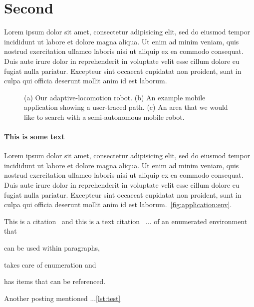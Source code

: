 \documentclass{proposal}
\begin{document}
\section{Second}
Lorem ipsum dolor sit amet, consectetur adipisicing elit, sed do eiusmod
tempor incididunt ut labore et dolore magna aliqua. Ut enim ad minim veniam,
quis nostrud exercitation ullamco laboris nisi ut aliquip ex ea commodo
consequat. Duis aute irure dolor in reprehenderit in voluptate velit esse
cillum dolore eu fugiat nulla pariatur. Excepteur sint occaecat cupidatat non
proident, sunt in culpa qui officia deserunt mollit anim id est laborum.

\begin{figure}
    \centering
    \hfil%
    \hfil%
    \caption{(a) Our adaptive-locomotion robot. (b) An example mobile application showing a user-traced path. (c) An area that we would like to search with a semi-autonomous mobile robot.}
    \label{fig:application}
\end{figure}

\paragraph{This is some text}
Lorem ipsum dolor sit amet, consectetur adipisicing elit, sed do eiusmod
tempor incididunt ut labore et dolore magna aliqua. Ut enim ad minim veniam,
quis nostrud exercitation ullamco laboris nisi ut aliquip ex ea commodo
consequat. Duis aute irure dolor in reprehenderit in voluptate velit esse
cillum dolore eu fugiat nulla pariatur. Excepteur sint occaecat cupidatat non
proident, sunt in culpa qui officia deserunt mollit anim id est laborum.~\autoref{fig:application:env}.

This is a citation~\autocite{einstein} and this is a text citation~\textcite{dirac}
... of an enumerated environment that
\begin{linline}
    \item can be used within paragraphs,
    \item takes care of enumeration and
    \item has items that can be referenced.
    \label{lst:test}
\end{linline}
Another posting mentioned ...\autoref{lst:test}
\end{document}
